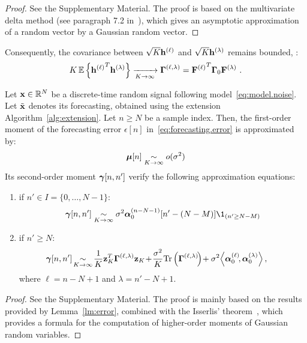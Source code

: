 \begin{proof}
See the Supplementary Material. The proof is based on the multivariate delta method (see paragraph 7.2 in~\cite{Alho05statistical}), which gives an asymptotic approximation of a random vector by a Gaussian random vector.
\end{proof}

Consequently, the covariance between $\sqrt{K}{\mathbf h}^{(\ell)}$ and $\sqrt{K}{\mathbf h}^{(\lambda)}$ remains bounded, \ie:
\begin{equation*}
K\,{\mathbb E}\left\{{{\mathbf h}^{(\ell)}}^T{\mathbf h}^{(\lambda)}\right\} \xrightarrow[K\to\infty]{} \boldsymbol{\Gamma}^{(\ell,\lambda)} = {{\mathbf F}^{(\ell)}}^T\boldsymbol{\Gamma}_0{\mathbf F}^{(\lambda)}\ .
\end{equation*}

\begin{theorem}
\label{th:error}
Let ${\mathbf x}\in{\mathbb R}^N$ be a discrete-time random signal following model~\eqref{eq:model.noise}. Let $\tilde{{\mathbf x}}$ denotes its forecasting, obtained using the extension Algorithm~\ref{alg:extension}. Let $n\geq N$ be a sample index. Then, the first-order moment of the forecasting error $\epsilon[n]$ in~\eqref{eq:forecasting.error} is approximated by:
\begin{equation}
\bmu[n] \underset{K\to\infty}{\sim} o(\sigma^2)
\label{eq:mean.error}
\end{equation}
Its second-order moment $\boldsymbol{\gamma}[n,n']$ verify the following approximation equations:
\begin{enumerate}[label=(\roman*)]
\item if $n'\in I=\{0,\ldots,N-1\}$:
\begin{equation}
\bgamma[n,n']\underset{K\to\infty}{\sim} \sigma^2\balpha_0^{(n-N-1)}[n'-(N-M)]\1_{(n'\geq N-M)}
\label{eq:cov.error.1}
\end{equation}
\item if $n'\geq N$:
\begin{equation}
\hspace{-15pt}\bgamma[n,n']\!\underset{K\to\infty}{\sim}\!\frac1K\bz_K^T\bGamma^{(\ell,\lambda)}\bz_K \!+\! \dfrac{\sigma^2}{K}\Tr\left(\bGamma^{(\ell,\lambda)}\!\right)\! + \sigma^2\!\left\langle\balpha_0^{(\ell)}\!, \balpha_0^{(\lambda)}\right\rangle ,
\label{eq:cov.error.2}
\end{equation}
where $\ell=n-N+1$ and $\lambda=n'-N+1$.
\end{enumerate}
\end{theorem}

\begin{proof}
See the Supplementary Material. The proof is mainly based on the results provided by Lemma~\ref{lm:error}, combined with the Isserlis' theorem~\cite{Isserlis16formula}, which provides a formula for the computation of higher-order moments of Gaussian random variables.
\end{proof}

